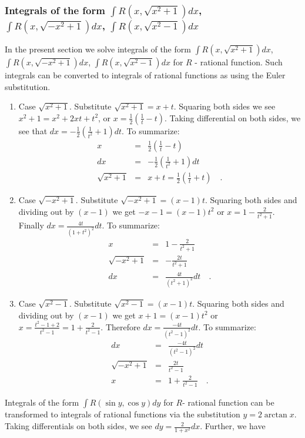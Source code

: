 \documentclass[12pt]{book}
\begin{document}
\subsubsection{Integrals of the form $\int R(x, \sqrt{x^2+1})dx$, $\int R(x, \sqrt{-x^2+1})dx$, $\int R(x, \sqrt{x^2-1})dx$}
In the present section we solve integrals of the form $\int R(x, \sqrt{x^2+1})dx$, $\int R(x, \sqrt{-x^2+1})dx$, $\int R(x, \sqrt{x^2-1})dx$ for $R$ - rational function. Such integrals can be converted to integrals of rational functions as using the Euler substitution.

\begin{enumerate}
\item Case $\sqrt{x^2+1}$. Substitute $\sqrt{x^2+1}= x+t $. Squaring both sides we see $x^2+1=x^2+2xt+t^2$, or $x=\frac12\left(\frac{1}{t}- t\right)$. Taking differential on both sides, we see that $dx=-\frac12(\frac{1}{t^2}+1) dt$. To summarize:
\begin{equation}\label{eqEulerSub1}
\begin{array}{rcl}
x&=&\frac12\left(\frac{1}{t}- t\right)\\
dx&=&-\frac12(\frac{1}{t^2}+1) dt\\
\sqrt{x^2+1}&=&x+t= \frac12 \left(\frac1t +t\right) \quad .
\end{array}
\end{equation}
\item Case $\sqrt{-x^2+1}$. Substitute $\sqrt{-x^2+1}=(x-1)t$. Squaring both sides and dividing out by $(x-1)$ we get $-x-1=(x-1)t^2$ or $x=1-\frac{2}{t^2+1}$. Finally $dx=\frac{4t}{(1+t^2)^2}dt$. To summarize:
\[
\begin{array}{rcl}
x&=&1-\frac{2}{t^2+1}\\
\sqrt{-x^2+1}&=&-\frac{2t}{t^2+1}\\
dx&=&\frac{4t}{(t^2+1)^2}dt\quad .
\end{array}
\] 
\item Case $\sqrt{x^2-1} $. Substitute $\sqrt{x^2-1}=(x-1)t$. Squaring both sides and dividing out by $(x-1)$ we get $x+1=(x-1)t^2$ or $x=\frac{t^2-1+2}{t^2-1}= 1+\frac{2}{t^2-1}$. Therefore $dx=\frac{-4t}{(t^2-1)^2}dt$. To summarize:
\[
\begin{array}{rcl}
dx&=&\frac{-4t}{(t^2-1)^2}dt\\
\sqrt{-x^2+1}&=&\frac{2t}{t^2-1} \\
x&=&1+\frac{2}{t^2-1}\quad .
\end{array}
\] 
\end{enumerate}
Integrals of the form $\int R(\sin y,\cos y )dy$ for $R$- rational function can be transformed to integrals of rational functions via the substitution $y= 2\arctan x$. Taking differentials on both sides, we see $dy=\frac{2}{1+x^2}dx$. Further, we have 
\end{document}
